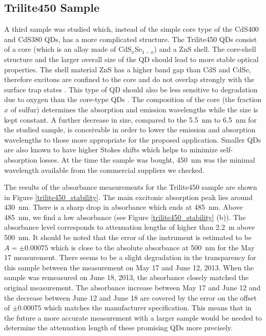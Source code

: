 \documentclass[cits]{JINST}
\begin{document}
\subsection{Trilite450 Sample}
A third sample was studied which, instead of the simple core type of the CdS400 and CdS380 QDs, has a more complicated structure. The Trilite450 QDs consist of a core (which is an alloy made of CdS$_x$Se$_{1-x}$) and a ZnS shell. The core-shell structure and the larger overall size of the QD should lead to more stable optical properties. The shell material ZnS has a higher band gap than CdS and CdSe, therefore excitons are confined to the core and do not overlap strongly with the surface trap states \cite{dabbousi1997}. This type of QD should also be less sensitive to degradation due to oxygen than the core-type QDs \cite{vanSark}. The composition of the core (the fraction $x$ of sulfur) determines the absorption and emission wavelengths while the size is kept constant. A further decrease in size, compared to the 5.5~nm to 6.5~nm for the studied sample, is conceivable in order to lower the emission and absorption wavelengths to those more appropriate for the proposed application. Smaller QDs are also known to have higher Stokes shifts \cite{swafford2006,capek,kuno1997} which helps to minimize self-absorption losses. At the time the sample was bought, 450~nm was the minimal wavelength available from the commercial suppliers we checked.

The results of the absorbance measurements for the Trilite450 sample are shown in Figure \ref{trilite450_stability}. The main excitonic absorption peak lies around 430~nm. There is a sharp drop in absorbance which ends at 485~nm. Above 485~nm, we find a low absorbance (see Figure \ref{trilite450_stability} (b)). The absorbance level corresponds to attenuation lengths of higher than 2.2~m above 500~nm. It should be noted that the error of the instrument is estimated to be $A = \pm 0.00075$ which is close to the absolute absorbance at 500~nm for the May 17 measurement. There seems to be a slight degradation in the transparency for this sample between the measurement on May 17 and June 12, 2013. When the sample was remeasured on June 18, 2013, the absorbance closely matched the original measurement. The absorbance increase between May 17 and June 12 and the decrease between June 12 and June 18 are covered by the error on the offset of $\pm 0.00075$ which matches the manufacturer specification. This means that in the future a more accurate measurement with a larger sample would be needed to determine the attenuation length of these promising QDs more precisely.
    
\end{document}
